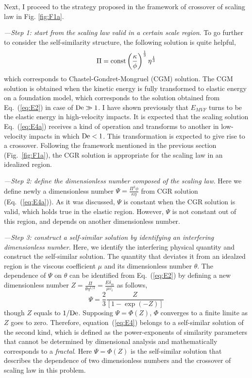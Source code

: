 \documentclass[default,iicol,10pt]{sn-jnl}%
\theoremstyle{thmstyleone}%
\theoremstyle{thmstyletwo}%
\theoremstyle{thmstylethree}%
\begin{document}
Next, I proceed to the strategy proposed in the framework of crossover of scaling law in Fig. \ref{fig:F1a}. 

{\it ---Step 1: start from the scaling law valid in a certain scale region}. To go further to consider the self-similarity structure, the following solution is quite helpful, 
\begin{equation}
\Pi = {\rm const}\left(\frac{\kappa}{\phi} \right)^{\frac{1}{3}} \eta^{\frac{1}{3}}
\label{eq:E4a}
\end{equation}
which corresponds to Chastel-Gondret-Mongruel (CGM) solution\cite{Chastel2016,Chastel2019,Mongruel2020}. The CGM solution is obtained when the kinetic energy is fully transformed to elastic energy on a foundation model, which corresponds to the solution obtained from Eq.~(\ref{eq:E2}) in case of ${\rm De} \gg 1$. I have shown previously that $E_{MVF}$ turns to be the elastic energy in high-velocity impacts. It is expected that the scaling solution Eq.~(\ref{eq:E4a}) receives a kind of operation and transforms to another in low-velocity impacts in which ${\rm De} < 1$. This transformation is expected to give rise to a crossover. Following the framework mentioned in the previous section (Fig.~\ref{fig:F1a}), the CGR solution is appropriate for the scaling law in an idealized region. 

{\it  ---Step 2: define the dimensionless number composed of the scaling law}. Here we define newly a dimensionless number $\Psi = \frac{ \Pi^3 \phi }{\kappa \eta}$ from CGR solution (Eq.~(\ref{eq:E4a})). As it was discussed, $\Psi$ is constant when the CGR solution is valid, which holds true in the elastic region. However, $\Psi$ is not constant out of this region, and depends on another dimensionless number. 

 {\it ---Step 3: construct a self-similar solution by identifying an interfering dimensionless number}. Here, we identify the interfering physical quantity and construct the self-similar solution. The quantity that deviates it from an idealzed region is the viscous coefficient $\mu$ and its dimensionless number $\theta$. The dependence of $\Psi$ on $\theta$ can be identified from Eq.~(\ref{eq:E2}) by defining a new dimensionless number $Z = \frac{ \Pi}{ \theta \eta^{1/2}} =\frac{ E \delta_m}{ \mu  v_i}$ as follows,
\begin{equation}
\Psi =  \frac{2}{3}\frac{Z}{\left[ 1-\exp \left( -Z \right)\right] }
\label{eq:E4}
\end{equation}
though $Z$ equals to $1/{\rm De}$. Supposing $\Psi = \Phi \left(Z  \right)$, $\Phi$ converges to a finite limite as $Z$ goes to zero\cite{Conv}. Therefore, equation~(\ref{eq:E4}) belongs to a self-similar solution of the second kind\cite{SecondKind}, which is defined as the power-exponents of similarity parameters that cannot be determined by dimensional analysis and mathematically corresponds to a {\it fractal}\cite{Mandelbrot1983}. Here $\Psi = \Phi \left(Z\right)$ is the self-similar solution that describes the dependence of two dimensionless numbers and the crossover of scaling law in this problem.
\end{document}
